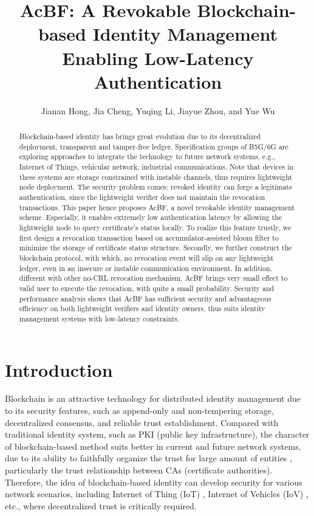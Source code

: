 \documentclass[conference]{IEEEtran}
\title{AcBF: A Revokable Blockchain-based Identity Management Enabling Low-Latency Authentication}
\author{Jianan Hong, Jia Cheng, Yuqing Li, Jiayue Zhou, and Yue Wu}
\begin{document}
\maketitle

\begin{abstract}
	Blockchain-based identity has brings great evolution due to its decentralized deployment, transparent and tamper-free ledger. Specification groups of B5G/6G are exploring approaches to integrate the technology to future network systems, e.g., Internet of Things, vehicular network, industrial communications. Note that devices in these systems are storage constrained with instable channels, thus requires lightweight node deployment. The security problem comes: revoked identity can forge a legitimate authentication, since the lightweight verifier does not maintain the revocation transactions. 
	This paper hence proposes AcBF, a novel revokable identity management scheme. Especially, it enables extremely low authentication latency by allowing the lightweight node to query certificate's status locally. To realize this feature trustly, we first design a revocation transaction based on accumulator-assisted bloom filter to minimize the storage of certificate status structure. Secondly, we further construct the blockchain protocol, with which, no revocation event will slip on any lightweight ledger, even in an insecure or instable communication environment.  
	In addition, different with other no-CRL revocation mechanism, AcBF brings very small effect to valid user to execute the revocation, with quite a small probability.
	Security and performance analysis
	shows that AcBF has sufficient security and advantageous efficiency on both lightweight verifiers and identity owners, thus suits identity management systems with low-latency constraints.
\end{abstract}

\section{Introduction}
Blockchain is an attractive technology for distributed identity management \cite{9075663} due to its security features, such as append-only and non-tempering storage, decentralized consensus, and reliable trust establishment. Compared with traditional identity system, such as PKI (public key infrastructure), the character of blockchain-based method suits better in current and future network systems, due to its ability to faithfully organize the trust for large amount of entities \cite{certchain2018,yang2018blockchain}, particularly the trust relationship between CAs (certificate authorities). 
Therefore, the idea of blockchain-based identity can develop security for various network scenarios, including Internet of Thing (IoT) \cite{zhangBPAFBlockchainEnabledReliable2022a}, Internet of Vehicles (IoV)  \cite{8010820,singh2018branch}, etc., where decentralized trust is critically required. 
\end{document}
